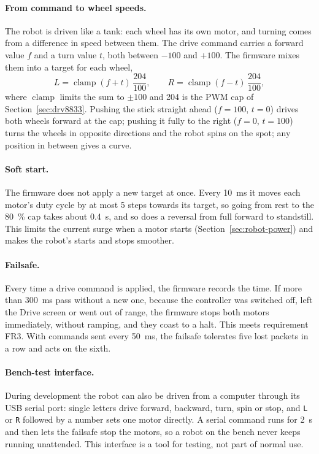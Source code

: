 \paragraph{From command to wheel speeds.} The robot is driven like a tank: each wheel has
its own motor, and turning comes from a difference in speed between them. The drive
command carries a forward value \(f\) and a turn value \(t\), both between \(-100\) and
\(+100\). The firmware mixes them into a target for each wheel,
\begin{equation}
  L = \operatorname{clamp}(f + t)\,\frac{204}{100}, \qquad
  R = \operatorname{clamp}(f - t)\,\frac{204}{100},
\end{equation}
where \(\operatorname{clamp}\) limits the sum to \(\pm 100\) and 204 is the PWM cap of
Section~\ref{sec:drv8833}. Pushing the stick straight ahead (\(f = 100\), \(t = 0\)) drives
both wheels forward at the cap; pushing it fully to the right (\(f = 0\), \(t = 100\))
turns the wheels in opposite directions and the robot spins on the spot; any position in
between gives a curve.

\paragraph{Soft start.} The firmware does not apply a new target at once. Every 10~ms it
moves each motor's duty cycle by at most 5 steps towards its target, so going from rest
to the 80~\% cap takes about 0.4~s, and so does a reversal from full forward to standstill.
This limits the current surge when a motor starts (Section~\ref{sec:robot-power}) and makes
the robot's starts and stops smoother.

\paragraph{Failsafe.} Every time a drive command is applied, the firmware records the
time. If more than 300~ms pass without a new one, because the controller was switched off,
left the Drive screen or went out of range, the firmware stops both motors immediately,
without ramping, and they coast to a halt. This meets requirement FR3. With commands
sent every 50~ms, the failsafe tolerates five lost packets in a row and acts on the sixth.

\paragraph{Bench-test interface.} During development the robot can also be driven from a
computer through its USB serial port: single letters drive forward, backward, turn, spin
or stop, and \texttt{L} or \texttt{R} followed by a number sets one motor directly. A
serial command runs for 2~s and then lets the failsafe stop the motors, so a robot on the
bench never keeps running unattended. This interface is a tool for testing, not part of
normal use.

